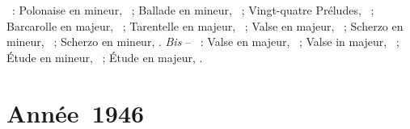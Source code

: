 \begin{description}
 \textsc{\Chopin{}}~: Polonaise en \kC \Sharp mineur,  ~;
 Ballade en \kG mineur, ~; Vingt-quatre Préludes, ~;
 Barcarolle en \kF \Sharp majeur, ~; Tarentelle en \kA \Flat
 majeur, ~; Valse  en \kA \Flat majeur, 
 ~; Scherzo en \kB \Flat mineur, ~; Scherzo en \kB
 mineur, .
 \emph{Bis} -- \textsc{\Chopin{}}~: Valse  en \kG \Flat majeur,
  ~; Valse  in \kA \Flat majeur, 
 ~; Étude en \kC \Sharp mineur,  ~; Étude en
 \kF majeur,  .
\end{description}

\section{Année~1946}

